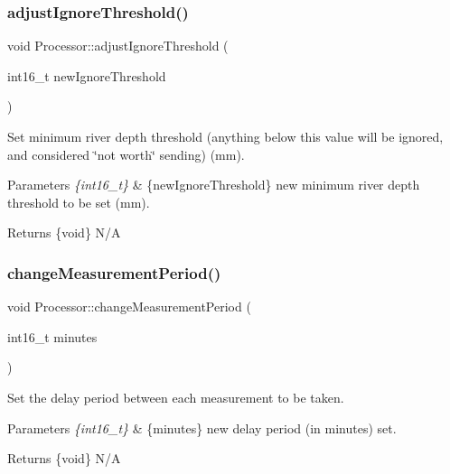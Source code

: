 \subsubsection{\texorpdfstring{adjust\+Ignore\+Threshold()}{adjustIgnoreThreshold()}}
{\footnotesize\ttfamily void Processor\+::adjust\+Ignore\+Threshold (\begin{DoxyParamCaption}\item[{int16\+\_\+t}]{new\+Ignore\+Threshold }\end{DoxyParamCaption})}

Set minimum river depth threshold (anything below this value will be ignored, and considered \char`\"{}not worth\char`\"{} sending) (mm). 
\begin{DoxyParams}{Parameters}
{\em \{int16\+\_\+t\}} & \{new\+Ignore\+Threshold\} new minimum river depth threshold to be set (mm). \\
\hline
\end{DoxyParams}
\begin{DoxyReturn}{Returns}
\{void\} N/A 
\end{DoxyReturn}
\mbox{\label{class_processor_a8b550c7a6be09f887291e14392cead11}} 
\subsubsection{\texorpdfstring{change\+Measurement\+Period()}{changeMeasurementPeriod()}}
{\footnotesize\ttfamily void Processor\+::change\+Measurement\+Period (\begin{DoxyParamCaption}\item[{int16\+\_\+t}]{minutes }\end{DoxyParamCaption})}

Set the delay period between each measurement to be taken. 
\begin{DoxyParams}{Parameters}
{\em \{int16\+\_\+t\}} & \{minutes\} new delay period (in minutes) set. \\
\hline
\end{DoxyParams}
\begin{DoxyReturn}{Returns}
\{void\} N/A 
\end{DoxyReturn}
\mbox{\label{class_processor_a6ad79126a7694ed86f3f5ccc36b606bd}} 

